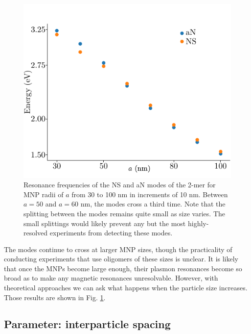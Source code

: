 \documentclass [11pt, proquest] {uwthesis}[2016/11/22]
\begin{document}
\begin{figure}
\begin{centering}
\includegraphics{bigger_particles.pdf}
\caption{Resonance frequencies of the NS and aN modes of the 2-mer for MNP radii of $a$ from 30 to 100 nm in increments of 10 nm. Between $a=50$ and $a=60$ nm, the modes cross a third time. Note that the splitting between the modes remains quite small as size varies. The small splittings would likely prevent any but the most highly-resolved experiments from detecting these modes.}
\label{bigp}
\end{centering}
\end{figure}


The modes continue to cross at larger MNP sizes, though the practicality of conducting experiments that use oligomers of these sizes is unclear. It is likely that once the MNPs become large enough, their plasmon resonances become so broad as to make any magnetic resonances unresolvable. However, with theoretical approaches we can ask what happens when the particle size increases. Those results are shown in Fig. \ref{bigp}. 

\subsection{Parameter: interparticle spacing}
\end{document}
